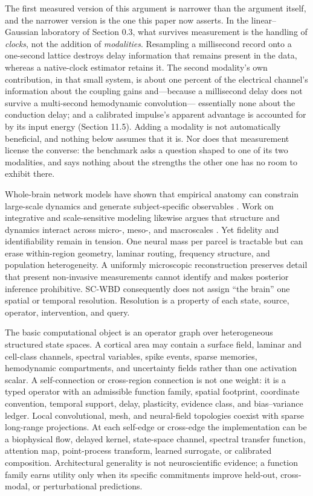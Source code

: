 The first measured version of this argument is narrower than the argument
itself, and the narrower version is the one this paper now asserts. In the
linear--Gaussian laboratory of Section 0.3, what survives measurement is the
handling of \emph{clocks}, not the addition of \emph{modalities}. Resampling a
millisecond record onto a one-second lattice destroys delay information that
remains present in the data, whereas a native-clock estimator retains it. The
second modality's own contribution, in that small system, is about one percent
of the electrical channel's information about the coupling gains and---because a
millisecond delay does not survive a multi-second hemodynamic convolution---
essentially none about the conduction delay; and a calibrated impulse's apparent
advantage is accounted for by its input energy (Section 11.5). Adding a modality
is not automatically beneficial, and nothing below assumes that it is. Nor does
that measurement license the converse: the benchmark asks a question shaped to
one of its two modalities, and says nothing about the strengths the other one
has no room to exhibit there.

Whole-brain network models have shown that empirical anatomy can constrain
large-scale dynamics and generate subject-specific observables
\citep{sanz2013,sanz2015,jirsa2017}. Work on integrative and
scale-sensitive modeling likewise argues that structure and dynamics interact
across micro-, meso-, and macroscales \citep{venkadesh2021,kobeleva2021}.
Yet fidelity and identifiability remain in tension. One neural mass per parcel
is tractable but can erase within-region geometry, laminar routing, frequency
structure, and population heterogeneity. A uniformly microscopic
reconstruction preserves detail that present non-invasive measurements cannot
identify and makes posterior inference prohibitive. SC-WBD consequently does
not assign “the brain” one spatial or temporal resolution. Resolution is a
property of each state, source, operator, intervention, and query.

The basic computational object is an operator graph over heterogeneous
structured state spaces. A cortical area may contain a surface field, laminar
and cell-class channels, spectral variables, spike events, sparse memories,
hemodynamic compartments, and uncertainty fields rather than one activation
scalar. A self-connection or cross-region connection is not one weight: it is
a typed operator with an admissible function family, spatial footprint,
coordinate convention, temporal support, delay, plasticity, evidence class,
and bias--variance ledger. Local convolutional, mesh, and neural-field
topologies coexist with sparse long-range projections. At each self-edge or
cross-edge the implementation can be a biophysical flow, delayed kernel,
state-space channel, spectral transfer function, attention map, point-process
transform, learned surrogate, or calibrated composition. Architectural
generality is not neuroscientific evidence; a function family earns utility
only when its specific commitments improve held-out, cross-modal, or
perturbational predictions.

